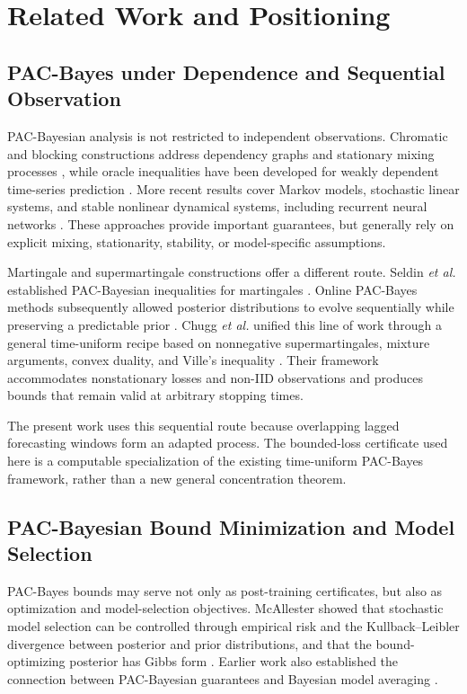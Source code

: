 \section{Related Work and Positioning}
\label{sec:related_work}

\subsection{PAC-Bayes under Dependence and Sequential Observation}

PAC-Bayesian analysis is not restricted to independent observations.
Chromatic and blocking constructions address dependency graphs and stationary mixing processes \cite{ralaivola2010chromatic}, while oracle inequalities have been developed for weakly dependent time-series prediction \cite{alquier2012model,alquier2013prediction}. More recent results cover Markov
models, stochastic linear systems, and stable nonlinear dynamical systems, including recurrent neural networks
\cite{banerjee2021tempered,eringis2021stochastic,eringis2024dynamical}.
These approaches provide important guarantees, but generally rely on explicit mixing, stationarity, stability, or model-specific assumptions.

Martingale and supermartingale constructions offer a different route.
Seldin \emph{et al.} established PAC-Bayesian inequalities for martingales \cite{seldin2012martingales}. Online PAC-Bayes methods subsequently allowed
posterior distributions to evolve sequentially while preserving a predictable prior \cite{haddouche2022online}. Chugg \emph{et al.} unified this line of work through a general time-uniform recipe based on nonnegative supermartingales, mixture arguments, convex duality, and Ville's inequality
\cite{chugg2023unified}. Their framework accommodates nonstationary losses and non-IID observations and produces bounds that remain valid at arbitrary
stopping times.

The present work uses this sequential route because overlapping lagged forecasting windows form an adapted process. The bounded-loss certificate used
here is a computable specialization of the existing time-uniform PAC-Bayes framework, rather than a new general concentration theorem.

\subsection{PAC-Bayesian Bound Minimization and Model Selection}

PAC-Bayes bounds may serve not only as post-training certificates, but also as optimization and model-selection objectives. McAllester showed that stochastic model selection can be controlled through empirical risk and the Kullback--Leibler divergence between posterior and prior distributions, and
that the bound-optimizing posterior has Gibbs form \cite{mcallester2003stochastic}. Earlier work also established the connection between PAC-Bayesian guarantees and Bayesian model averaging \cite{mcallester1999averaging}.


